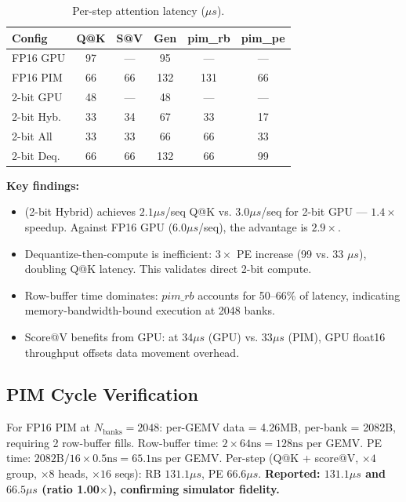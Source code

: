 \begin{table}[t]
\caption{Per-step attention latency ($\mu s$).}
\label{tab:main}
\centering
\begin{tabular}{lccccc}
\toprule
\textbf{Config} & \textbf{Q@K} & \textbf{S@V} & \textbf{Gen} & \textbf{pim\_rb} & \textbf{pim\_pe} \\
\midrule
FP16 GPU   & 97 & --- & 95  & --- & --- \\
FP16 PIM   & 66 & 66  & 132 & 131 & 66  \\
2-bit GPU  & 48 & --- & 48  & --- & --- \\
2-bit Hyb. & 33 & 34  & 67  & 33  & 17  \\
2-bit All  & 33 & 33  & 66  & 66  & 33  \\
2-bit Deq. & 66 & 66  & 132 & 66  & 99  \\
\bottomrule
\end{tabular}
\end{table}

\textbf{Key findings:}
\begin{itemize}
\item \pimattn{} (2-bit Hybrid) achieves $2.1\mu s$/seq Q@K vs. $3.0\mu s$/seq for 2-bit GPU --- $1.4\times$ speedup. Against FP16 GPU ($6.0\mu s$/seq), the advantage is $2.9\times$.
\item Dequantize-then-compute is inefficient: $3\times$ PE increase (99 vs. 33 $\mu s$), doubling Q@K latency. This validates direct 2-bit compute.
\item Row-buffer time dominates: $pim\_rb$ accounts for 50--66\% of latency, indicating memory-bandwidth-bound execution at 2048 banks.
\item Score@V benefits from GPU: at 34$\mu s$ (GPU) vs. 33$\mu s$ (PIM), GPU float16 throughput offsets data movement overhead.
\end{itemize}

\subsection{PIM Cycle Verification}

For FP16 PIM at $N_{\text{banks}}\!=\!2048$: per-GEMV data = 4.26MB, per-bank = 2082B, requiring 2 row-buffer fills.
Row-buffer time: $2 \times 64\text{ns} = 128\text{ns}$ per GEMV.
PE time: $2082\text{B}/16 \times 0.5\text{ns} = 65.1\text{ns}$ per GEMV.
Per-step (Q@K + score@V, $\times 4$ group, $\times 8$ heads, $\times 16$ seqs): RB $131.1\mu s$, PE $66.6\mu s$.
\textbf{Reported: $131.1\mu s$ and $66.5\mu s$ (ratio 1.00$\times$), confirming simulator fidelity.}

